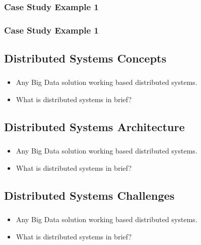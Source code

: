 \begin{frame}[plain,c]
	\frametitle{Case Study Example 1}

\end{frame}
\begin{frame}[plain,c]
	\frametitle{Case Study Example 1}
	
\end{frame}

\subsection{Distributed Systems Concepts}
\begin{frame}
\frametitle{\subsecname}
\begin{itemize} 
	\item Any Big Data solution working based distributed systems.
	\item What is distributed systems in brief?
\end{itemize}
\end{frame}




\subsection{Distributed Systems Architecture}
\begin{frame}
\frametitle{\subsecname}
\begin{itemize} 
	\item Any Big Data solution working based distributed systems.
	\item What is distributed systems in brief?
\end{itemize}
\end{frame}



\subsection{Distributed Systems Challenges}
\begin{frame}
\frametitle{\subsecname}
\begin{itemize} 
	\item Any Big Data solution working based distributed systems.
	\item What is distributed systems in brief?
\end{itemize}
\end{frame}

